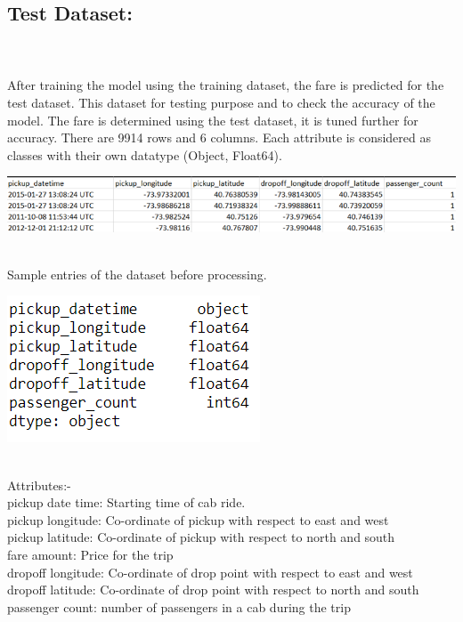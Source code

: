 \documentclass[journal,twoside,web]{ieeecolor}
\begin{document}
\subsection{Test Dataset:}
\\
\\
After training the model using the training dataset, the fare is predicted for the test dataset. This dataset for testing purpose and to check the accuracy of the model.  The fare is determined using the test dataset, it is tuned  further  for  accuracy.  There  are  9914  rows  and  6 columns. Each attribute is considered as classes with their own datatype (Object, Float64).
\\
\begin{center}
\includegraphics[scale=0.50]{Picture3.png}
\end{center}
\\
Sample entries of the dataset before processing.
\begin{center}
\includegraphics[scale=0.50]{Picture4.png}
\end{center}
\\
Attributes:-
\\
pickup date time: Starting time of cab ride.
\\
pickup longitude: Co-ordinate of pickup with respect to east and west
\\
pickup latitude: Co-ordinate of pickup with respect to north and south
\\
fare amount: Price for the trip 
\\
dropoff longitude: Co-ordinate of drop point with respect to east and west
\\
dropoff latitude: Co-ordinate of drop point with respect to north and south
\\
passenger count: number of passengers in a cab during the trip
\\
\\
\end{document}
